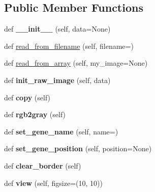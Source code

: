 \subsection*{Public Member Functions}
\begin{DoxyCompactItemize}
\item 
\mbox{\label{class_embryo_1_1_embryo_af49ff64c2e3b95933b94ddaf3989aa06}} 
def {\bfseries \+\_\+\+\_\+init\+\_\+\+\_\+} (self, data=None)
\item 
def \mbox{\hyperlink{class_embryo_1_1_embryo_a208d6fb0e57105830994b09dce283064}{read\+\_\+from\+\_\+filename}} (self, filename=\textquotesingle{}\textquotesingle{})
\item 
def \mbox{\hyperlink{class_embryo_1_1_embryo_aa568f5ad275a365055f973495d8f9ac6}{read\+\_\+from\+\_\+array}} (self, my\+\_\+image=None)
\item 
\mbox{\label{class_embryo_1_1_embryo_a0ce7d62b678b8aa6e19dbd4a8394358d}} 
def {\bfseries init\+\_\+raw\+\_\+image} (self, data)
\item 
\mbox{\label{class_embryo_1_1_embryo_a10d441809238ba203ee43776cb09681a}} 
def {\bfseries copy} (self)
\item 
\mbox{\label{class_embryo_1_1_embryo_ad0f77aab46142276487c416c7ea9e037}} 
def {\bfseries rgb2gray} (self)
\item 
\mbox{\label{class_embryo_1_1_embryo_ad0346b0ba0e254fd586ffcaeccffadfa}} 
def {\bfseries set\+\_\+gene\+\_\+name} (self, name=\textquotesingle{}\textquotesingle{})
\item 
\mbox{\label{class_embryo_1_1_embryo_ad62fefc90d3c023fce6f06347bb7fe19}} 
def {\bfseries set\+\_\+gene\+\_\+position} (self, position=None)
\item 
\mbox{\label{class_embryo_1_1_embryo_a3e1b006e54c0bae4b03ee96300358ae3}} 
def {\bfseries clear\+\_\+border} (self)
\item 
\mbox{\label{class_embryo_1_1_embryo_a7bd2e9b8860250e17a25767a2bb342de}} 
def {\bfseries view} (self, figsize=(10, 10))
\end{DoxyCompactItemize}
